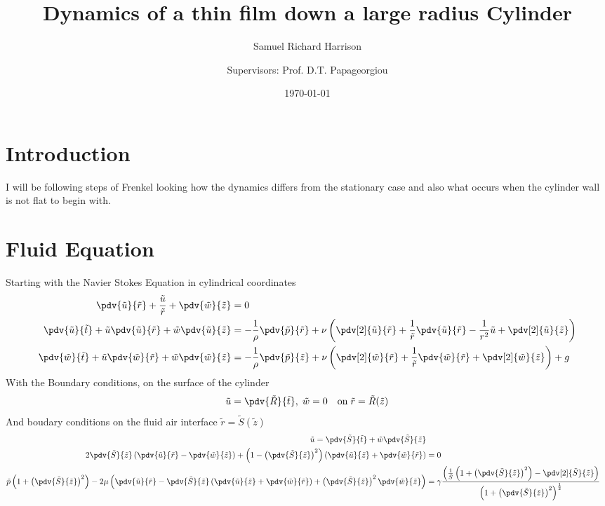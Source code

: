 \documentclass[12pt]{article}
\title{Dynamics of a thin film down a large radius Cylinder}
\author[1,2]{Samuel Richard Harrison}
\author[2]{\authorcr Supervisors: Prof. D.T. Papageorgiou}
\affil[1]{ University of Reading}
\affil[2]{Imperial College London}
\date{\today}
\begin{document}
\maketitle

\begin{abstract}
	
\end{abstract}
\section{Introduction}
I will be following steps of  Frenkel \cite{frenkel1993evolution} looking how the dynamics differs from the stationary case and also what occurs when the cylinder wall is not flat to begin with.
\section{Fluid Equation}
Starting with the Navier Stokes Equation in cylindrical coordinates
\begin{align}
\pdv{\tilde u}{\tilde r}+\frac{\tilde u}{\tilde r}+\pdv{\tilde w}{\tilde z}&=0\\
\pdv{\tilde u}{\tilde t}+\tilde u\pdv{\tilde u}{\tilde r}+\tilde w\pdv{\tilde u}{\tilde z}&=-\frac{1}{\rho}\pdv{\tilde p}{\tilde r}+\nu\left(\pdv[2]{\tilde u}{\tilde r}+\frac{1}{\tilde r}\pdv{\tilde u}{\tilde r}-\frac{1}{r^2}\tilde u+\pdv[2]{\tilde u}{\tilde z}\right)\\
\pdv{\tilde w}{\tilde t}+\tilde u\pdv{\tilde w}{\tilde r}+\tilde w\pdv{\tilde w}{\tilde z}&=-\frac{1}{\rho}\pdv{\tilde p}{\tilde z}+\nu\left(\pdv[2]{\tilde w}{\tilde r}+\frac{1}{\tilde r}\pdv{\tilde w}{\tilde r}+\pdv[2]{\tilde w}{\tilde z}\right) + g 
\end{align}
With the Boundary conditions, on the surface of the cylinder
\begin{align}
\tilde u=\pdv{\tilde R}{\tilde t},\;\tilde  w=0\quad\mathrm{on}\; \tilde r=\tilde R(\tilde z) \\
\end{align}
And boudary conditions on the fluid air interface $\tilde r = \tilde S(\tilde z)$
\begin{align}
\tilde   u=\pdv{\tilde S}{\tilde t}+\tilde w\pdv{\tilde S}{\tilde z} \\
2\pdv{\tilde S}{\tilde z}\left(\pdv{\tilde u}{\tilde r}-\pdv{\tilde w}{\tilde z}\right)+\left(1-\left(\pdv{\tilde S}{\tilde z}\right)^2\right)\left(\pdv{\tilde u}{\tilde z}+\pdv{\tilde w}{\tilde r}\right)&=0\label{tangstress}\\
\tilde p\left(1+\left(\pdv{\tilde S}{\tilde z}\right)^2\right)-2\mu\left( \pdv{\tilde u}{\tilde r}-\pdv{\tilde S}{\tilde z}\left(\pdv{\tilde u}{\tilde z}+\pdv{\tilde w}{\tilde r}\right)+\left(\pdv{\tilde S}{\tilde z}\right)^2\pdv{\tilde w}{\tilde z}\right)&=\gamma\frac{\left(\frac{1}{\tilde S}\left(1+\left(\pdv{\tilde S}{\tilde z}\right)^2\right)-\pdv[2]{\tilde S}{\tilde z}\right)}{\left(1+\left(\pdv{\tilde S}{\tilde z}\right)^2\right)^{\frac{1}{2}}}\label{normstress}
\end{align}
\end{document}
